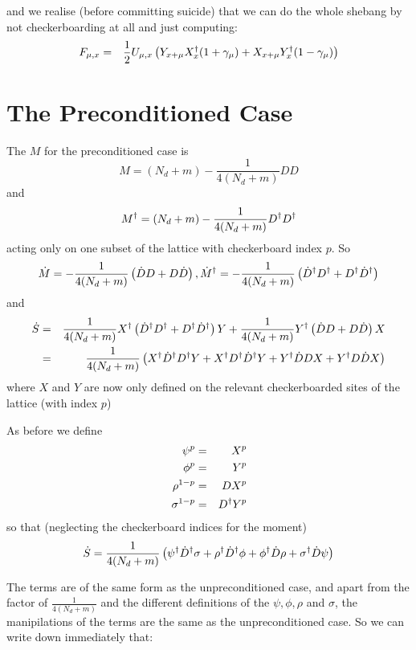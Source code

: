 \documentclass[12pt]{article}
\begin{document}
and we realise (before committing suicide) that we can do the whole shebang
by not checkerboarding at all and just computing:
\begin{eqnarray}
F_{\mu,x} &=& \frac{1}{2} U_{\mu, x} \left( Y_{x+\mu}X^{\dagger}_{x} (1 + \gamma_{\mu}) + X_{x+\mu} Y^{\dagger}_{x} (1 - \gamma_{\mu}) \right) 
\end{eqnarray} 

\section{The Preconditioned Case}
The $M$ for the preconditioned case is
\begin{equation} 
M = (N_d + m) - \frac{1}{4(N_d + m)} D D 
\end{equation}
and
\begin{equation}
M^{\dagger} = (N_d + m) - \frac{1}{4(N_d + m)} D^{\dagger} D^{\dagger}
\end{equation}
 acting only on one subset of the lattice with checkerboard index $p$. So
\begin{equation}
\dot{M} = -\frac{1}{4(N_d + m) }\left( \dot{D} D + D \dot{D} \right), \dot{M}^{\dagger} = -\frac{1}{4(N_d + m)} \left( \dot{D}^{\dagger} D^{\dagger} + D^{\dagger} \dot{D}^{\dagger} \right)
\end{equation}
and
\begin{eqnarray}
\dot{S} &=& \frac{1}{4(N_d + m)} X^{\dagger} \left( \dot{D}^{\dagger} D^{\dagger} + D^{\dagger} \dot{D}^{\dagger} \right) Y + \frac{1}{4(N_d + m)} Y^{\dagger} \left(  \dot{D} D + D \dot{D} \right) X \\
      &=& \frac{1}{4(N_d + m)} \left( X^{\dagger} \dot{D}^{\dagger} D^{\dagger} Y + X^{\dagger} D^{\dagger} \dot{D}^{\dagger} Y + Y^{\dagger} \dot{D} D X + Y^{\dagger} D \dot{D} X \right)
\end{eqnarray}
where $X$ and $Y$ are now only defined on the relevant checkerboarded sites of the lattice (with index $p$)

As before we define
\begin{eqnarray} 
  \psi^{p} &=& X^p \\
  \phi^{p} &=& Y^p \\
  \rho^{1-p} &=& D X^p \\
  \sigma^{1-p}   &=& D^{\dagger} Y^p
\end{eqnarray}
so that (neglecting the checkerboard indices for the moment)
\begin{equation}
\dot{S} = \frac{1}{4(N_d + m)} \left( \psi^{\dagger} \dot{D}^{\dagger} \sigma + \rho^{\dagger} \dot{D}^{\dagger} \phi + \phi^{\dagger} \dot{D} \rho + \sigma^{\dagger} \dot{D} \psi \right) 
\end{equation}

The terms are of the same form as the unpreconditioned case, and apart 
from the factor of $\frac{1}{4(N_d + m)}$ and the different definitions of the $\psi, \phi, \rho$ and $\sigma$, the manipilations of the terms are the same as the 
unpreconditioned case. So we can write down immediately that:
\end{document}
